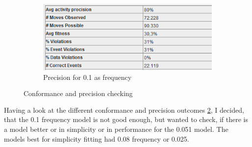 \begin{figure}[h]
\begin{subfigure}{.49\textwidth}
  \centering
  \includegraphics[width=\linewidth]{P_Precision0-1.PNG}
  \caption{Precision for 0.1 as frequency}
  \label{fig:P_Prec0-1}
\end{subfigure}
\caption{Conformance and precision checking}
\label{fig:P_ConfPrec}
\end{figure}


Having a look at the different conformance and precision outcomes \ref{fig:P_ConfPrec}, I decided, that the 0.1 frequency model is not good enough, but wanted to check, if there is a model better or in simplicity or in performance for the 0.051 model. The models best for simplicity fitting had 0.08 frequency or 0.025.

